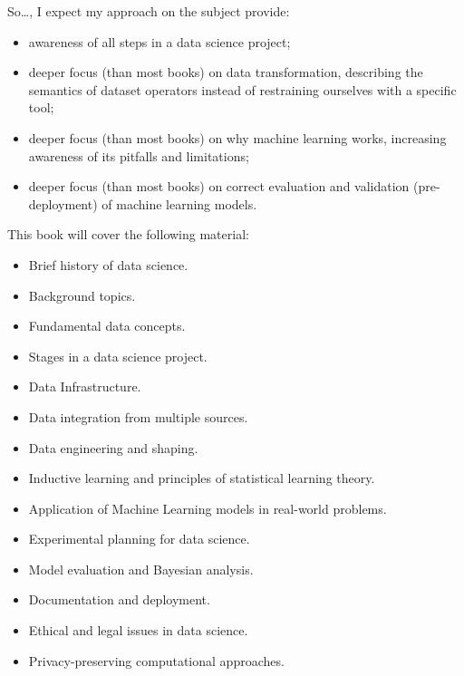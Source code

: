 So\dots, I expect my approach on the subject provide:
\begin{itemize}
  \item awareness of all steps in a data science project;
  \item deeper focus (than most books) on data transformation, describing the semantics of dataset
    operators instead of restraining ourselves with a specific tool;
  \item deeper focus (than most books) on why machine learning works, increasing awareness of its pitfalls and
    limitations;
  \item deeper focus (than most books) on correct evaluation and validation
    (pre-deployment) of machine learning models.
\end{itemize}

This book will cover the following material:
\begin{itemize}
  \item Brief history of data science.
  \item Background topics.
  \item Fundamental data concepts.
  \item Stages in a data science project.
  \item Data Infrastructure.
  \item Data integration from multiple sources.
  \item Data engineering and shaping.
  \item Inductive learning and principles of statistical learning theory.
  \item Application of Machine Learning models in real-world problems.
  \item Experimental planning for data science.
  \item Model evaluation and Bayesian analysis.
  \item Documentation and deployment.
  \item Ethical and legal issues in data science.
  \item Privacy-preserving computational approaches.
\end{itemize}
